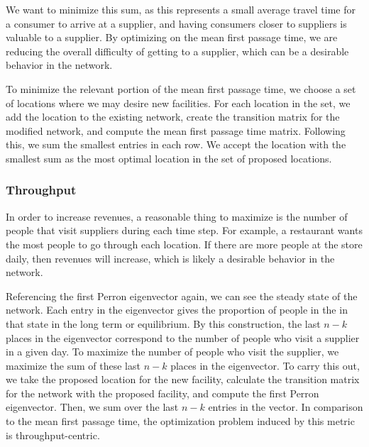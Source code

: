 \documentclass[twoside,twocolumn]{article}
\begin{document}
We want to minimize this sum, as this represents a small average travel time for a consumer to arrive at a supplier, and having consumers closer to suppliers is valuable to a supplier.
By optimizing on the mean first passage time, we are reducing the overall difficulty of getting to a supplier, which can be a desirable behavior in the network.

To minimize the relevant portion of the mean first passage time, we choose a set of locations where we may desire new facilities. 
For each location in the set, we add the location to the existing network, create the transition matrix for the modified network, and compute the mean first passage time matrix.
Following this, we sum the smallest entries in each row.
We accept the location with the smallest sum as the most optimal location in the set of proposed locations.


\subsubsection{Throughput}
In order to increase revenues, a reasonable thing to maximize is the number of people that visit suppliers during each time step.
For example, a restaurant wants the most people to go through each location.
If there are more people at the store daily, then revenues will increase, which is likely a desirable behavior in the network.

Referencing the first Perron eigenvector again, we can see the steady state of the network. 
Each entry in the eigenvector gives the proportion of people in the in that state in the long term or equilibrium. 
By this construction, the last $n - k$ places in the eigenvector correspond to the number of people who visit a supplier in a given day.
To maximize the number of people who visit the supplier, we maximize the sum of these last $n - k$ places in the eigenvector.
To carry this out, we take the proposed location for the new facility, calculate the transition matrix for the network with the proposed facility, and compute the first Perron eigenvector.
Then, we sum over the last $n - k$ entries in the vector.
In comparison to the mean first passage time, the optimization problem induced by this metric is throughput-centric.
\end{document}
